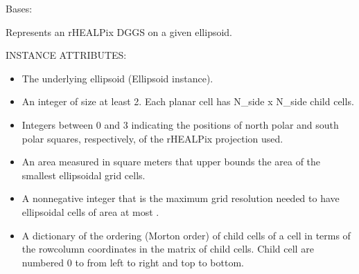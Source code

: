 \documentclass[a4paper,12ptopenany,oneside,english]{sphinxmanual}
\begin{document}
\begin{fulllineitems}
\label{\detokenize{dggs:rhealpixdggs.dggs.RHEALPixDGGS}}
\pysigstartsignatures
\pysiglinewithargsret
{}
{\sphinxparamcomma {}\sphinxparamcomma {}\sphinxparamcomma {}\sphinxparamcomma {}}
{}
\pysigstopsignatures
\sphinxAtStartPar
Bases: 

\sphinxAtStartPar
Represents an rHEALPix DGGS on a given ellipsoid.

\sphinxAtStartPar
INSTANCE ATTRIBUTES:
\begin{itemize}
\item {} 
\sphinxAtStartPar
{} \sphinxhyphen{} The underlying ellipsoid (Ellipsoid instance).

\item {} 
\sphinxAtStartPar
{} \sphinxhyphen{} An integer of size at least 2.
Each planar cell has N\_side x N\_side child cells.

\item {} 
\sphinxAtStartPar
{} \sphinxhyphen{} Integers between 0 and 3 indicating
the positions of north polar and south polar squares, respectively,
of the rHEALPix projection used.

\item {} 
\sphinxAtStartPar
{} \sphinxhyphen{} An area measured in square meters that
upper bounds the area of the smallest ellipsoidal grid cells.

\item {} 
\sphinxAtStartPar
{} \sphinxhyphen{} A nonnegative integer that is the maximum grid
resolution needed to have ellipsoidal cells of area at most
.

\item {} 
\sphinxAtStartPar
{} \sphinxhyphen{} A dictionary of the ordering (Morton order) of child
cells of a cell in terms of the row\sphinxhyphen{}column coordinates in the matrix
of child cells.  Child cell are numbered 0 to  from
left to right and top to bottom.


\end{itemize}
\end{fulllineitems}
\end{document}
